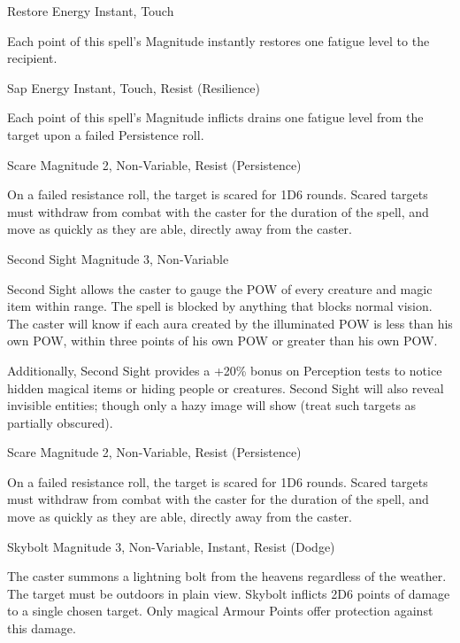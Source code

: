\begin{rpg-spell}
{Restore Energy}
{Instant, Touch}

Each point of this spell’s Magnitude instantly restores one fatigue level to the recipient.
\end{rpg-spell}


\begin{rpg-spell}
{Sap Energy}
{Instant, Touch, Resist (Resilience)}

Each point of this spell’s Magnitude inflicts drains one fatigue level from the target upon a failed Persistence roll.
\end{rpg-spell}


\begin{rpg-spell}
{Scare}
{Magnitude 2, Non-Variable, Resist (Persistence)}

On a failed resistance roll, the target is scared for 1D6 rounds. Scared targets must withdraw from combat with the caster for the duration of the spell, and move as quickly as they are able, directly away from the caster.
\end{rpg-spell}


\begin{rpg-spell}
{Second Sight}
{Magnitude 3, Non-Variable}

Second Sight allows the caster to gauge the POW of every creature and magic item within range. The spell is blocked by anything that blocks normal vision. The caster will know if each aura created by the illuminated POW is less than his own POW, within three points of his own POW or greater than his own POW. 

Additionally, Second Sight provides a +20\% bonus on Perception tests to notice hidden magical items or hiding people or creatures. Second Sight will also reveal invisible entities; though only a hazy image will show (treat such targets as partially obscured). 
\end{rpg-spell}


\begin{rpg-spell}
{Scare}
{Magnitude 2, Non-Variable, Resist (Persistence)}

On a failed resistance roll, the target is scared for 1D6 rounds. Scared targets must withdraw from combat with the caster for the duration of the spell, and move as quickly as they are able, directly away from the caster.
\end{rpg-spell}


\begin{rpg-spell}
{Skybolt}
{Magnitude 3, Non-Variable, Instant, Resist (Dodge)}

The caster summons a lightning bolt from the heavens regardless of the weather. The target must be outdoors in plain view. Skybolt inflicts 2D6 points of damage to a single chosen target. Only magical Armour Points offer protection against this damage.
\end{rpg-spell}


